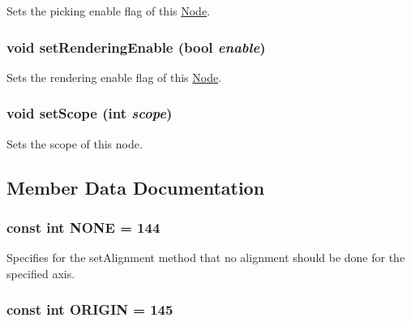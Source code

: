 Sets the picking enable flag of this \hyperlink{classm3g_1_1Node}{Node}. \hypertarget{classm3g_1_1Node_58981ef7aea1bf0e630bcc065b2987e9}{
\subsubsection[{setRenderingEnable}]{\setlength{\rightskip}{0pt plus 5cm}void setRenderingEnable (bool {\em enable})}}
\label{classm3g_1_1Node_58981ef7aea1bf0e630bcc065b2987e9}


Sets the rendering enable flag of this \hyperlink{classm3g_1_1Node}{Node}. \hypertarget{classm3g_1_1Node_55f324f307a01705b9094a73af4ecd68}{
\subsubsection[{setScope}]{\setlength{\rightskip}{0pt plus 5cm}void setScope (int {\em scope})}}
\label{classm3g_1_1Node_55f324f307a01705b9094a73af4ecd68}


Sets the scope of this node. 

\subsection{Member Data Documentation}
\hypertarget{classm3g_1_1Node_7b20f1b443e093d5ec5e990e73b47232}{
\subsubsection[{NONE}]{\setlength{\rightskip}{0pt plus 5cm}const int {\bf NONE} = 144}}
\label{classm3g_1_1Node_7b20f1b443e093d5ec5e990e73b47232}


Specifies for the setAlignment method that no alignment should be done for the specified axis. \hypertarget{classm3g_1_1Node_1b0d56eb173868ff472a6fd296c5bb6c}{
\subsubsection[{ORIGIN}]{\setlength{\rightskip}{0pt plus 5cm}const int {\bf ORIGIN} = 145}}
\label{classm3g_1_1Node_1b0d56eb173868ff472a6fd296c5bb6c}


